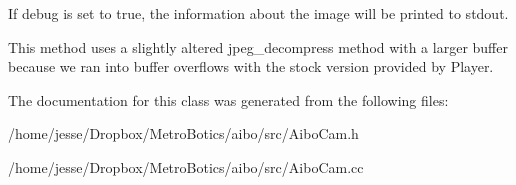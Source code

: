 If debug is set to true, the information about the image will be printed to stdout. 

This method uses a slightly altered jpeg\_\-decompress method with a larger buffer because we ran into buffer overflows with the stock version provided by Player.



The documentation for this class was generated from the following files:\begin{DoxyCompactItemize}
\item 
/home/jesse/Dropbox/MetroBotics/aibo/src/AiboCam.h\item 
/home/jesse/Dropbox/MetroBotics/aibo/src/AiboCam.cc\end{DoxyCompactItemize}
